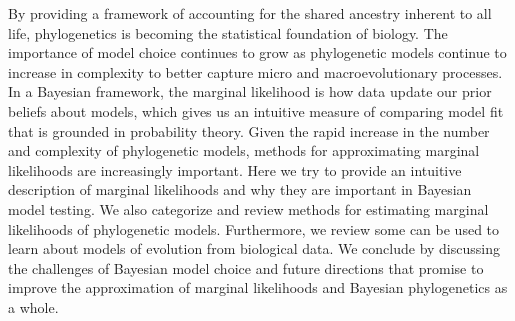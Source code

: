By providing a framework of accounting for the shared ancestry inherent to all
life,
phylogenetics is becoming the statistical foundation of biology.
The importance of model choice continues to grow as phylogenetic models
continue to increase in complexity to better capture micro and
macroevolutionary processes.
In a Bayesian framework, 
the marginal likelihood is how data update our prior beliefs about models,
which gives us an intuitive measure of comparing model fit that is grounded in
probability theory.
Given the rapid increase in the number and complexity of phylogenetic models,
methods for approximating marginal likelihoods are increasingly important.
Here we try to provide an intuitive description of marginal likelihoods and why
they are important in Bayesian model testing.
We also categorize and review methods for estimating marginal likelihoods of
phylogenetic models.
Furthermore, we review some
  can be used to learn about models of evolution from biological
data.
We conclude by discussing the challenges of Bayesian model choice and future
directions that promise to improve the approximation of marginal likelihoods
and Bayesian phylogenetics as a whole.
